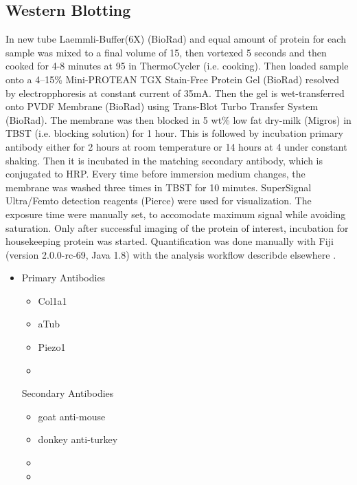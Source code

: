 \subsection{Western Blotting}
In new tube Laemmli-Buffer(6X) (BioRad) and equal amount of protein for each sample was mixed to a final volume of 15\mul{}, then  vortexed 5 seconds and then cooked for 4-8 minutes at 95 \degC in ThermoCycler (i.e. cooking). Then loaded sample onto a 4–15\% Mini-PROTEAN TGX Stain-Free Protein Gel (BioRad) resolved by electropphoresis at constant current of 35mA. Then the gel is wet-transferred onto PVDF Membrane (BioRad) using Trans-Blot Turbo Transfer System (BioRad). The membrane was then blocked in 5 wt\% low fat dry-milk (Migros) in TBST (i.e. blocking solution) for 1 hour. This is followed by incubation primary antibody either for 2 hours at room temperature or 14 hours at 4 \degC{} under constant shaking. Then it is incubated in the matching secondary antibody, which is conjugated to HRP. Every time before immersion medium changes, the membrane was washed three times in TBST for 10 minutes. SuperSignal Ultra/Femto  detection reagents (Pierce) were used for visualization. The exposure time were manually set, to accomodate maximum signal while avoiding saturation. Only after successful imaging of the protein of interest, incubation for housekeeping protein was started. Quantification was done manually with Fiji (version 2.0.0-rc-69, Java 1.8) with the analysis workflow describde elsewhere \cite{Miller2010}.



\begin{itemize}
    \item Primary Antibodies
    \begin{itemize}
        \item Col1a1
        \item aTub
        \item Piezo1
        \item 
    \end{itemize}

 Secondary Antibodies
    \begin{itemize}
        \item goat anti-mouse
        \item donkey anti-turkey
        \item 
        \item 
    \end{itemize}
\end{itemize}


